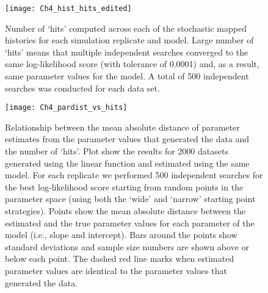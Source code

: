 \begin{figure}[hp]
	\centering
	\texttt{[image: Ch4\_hist\_hits\_edited]}
	\caption[Number of `hits' computed across each of the stochastic mapped histories for each simulation replicate and model.]{Number of `hits' computed across each of the stochastic mapped histories for each simulation replicate and model. Large number of `hits' means that multiple independent searches converged to the same log-likelihood score (with tolerance of 0.0001) and, as a result, same parameter values for the model. A total of 500 independent searches was conducted for each data set.}
	\label{fig:hist_hits}
\end{figure}

\begin{figure}[hp]
	\centering
	\texttt{[image: Ch4\_pardist\_vs\_hits]}
	\caption[Relationship between the mean absolute distance of parameter estimates from the parameter values that generated the data and the number of `hits' after 500 independent searches.]{Relationship between the mean absolute distance of parameter estimates from the parameter values that generated the data and the number of `hits'. Plot show the results for 2000 datasets generated using the linear function and estimated using the same model. For each replicate we performed 500 independent searches for the best log-likelihood score starting from random points in the parameter space (using both the `wide' and `narrow' starting point strategies). Points show the mean absolute distance between the estimated and the true parameter values for each parameter of the model (i.e., slope and intercept). Bars around the points show standard deviations and sample size numbers are shown above or below each point. The dashed red line marks when estimated parameter values are identical to the parameter values that generated the data.}
	\label{fig:pardist}
\end{figure}